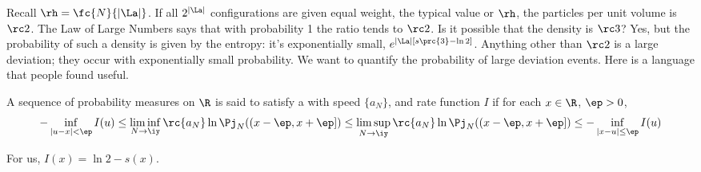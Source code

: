 Recall $\rh=\fc{N}{|\La|}$. %
If all $2^{|\La|}$ configurations are given equal weight, the typical value or $\rh$, the particles per unit volume is $\rc2$. The Law of Large Numbers says that with probability 1 the ratio tends to $\rc2$. Is it possible that the density is $\rc3$? Yes, but the probability of such a density is given by the entropy: it's exponentially small, $e^{|\La|[s\prc{3} -\ln 2]}$. Anything other than $\rc2$ is a large deviation; they occur with exponentially small probability. We want to quantify the probability of large deviation events. Here is a language that people found useful.
\begin{df}
A sequence of probability measures on $\R$ is said to satisfy a  with speed $\{a_N\}$, and rate function $I$ if for each $x\in \R$, $\ep>0$,
\[
-\inf_{|u-x|<\ep} I(u)\le 
\liminf_{N\to \iy}\rc{a_N} \ln \Pj_N((x-\ep,x+\ep]) \le \limsup_{N\to \iy} \rc{a_N} \ln \Pj_N((x-\ep,x+\ep]) \le 
-\inf_{|x-u|\le \ep} I(u)
\]
\end{df}
For us, $I(x)=\ln 2 - s(x)$.
